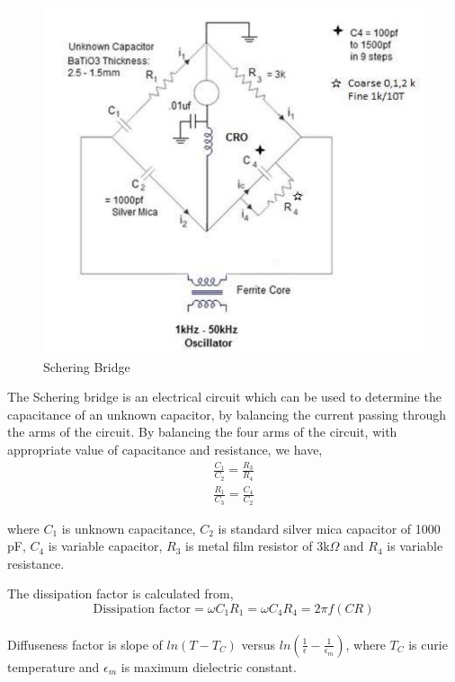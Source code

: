 \documentclass[a4paper, amsfonts, amssymb, amsmath, reprint, showkeys, nofootinbib, twoside]{revtex4-1}
\begin{document}
\begin{figure}[H]
	\centering
	\includegraphics[scale=0.35]{3}
	\caption{Schering Bridge}
	\label{1}
\end{figure}

The Schering bridge is an electrical circuit which can be used to determine the capacitance of an unknown capacitor, by balancing the current passing through the arms of the circuit. By balancing the four arms of the circuit, with appropriate value of capacitance and resistance, we have,
\begin{align}
	\frac {C_1}{ C_2}=\frac{R_3}{R_4}\\
	\frac {R_1}{ C_3}=\frac{C_4}{C_2}
\end{align}

where $C_1$ is unknown capacitance, $C_2$ is standard silver mica capacitor of 1000 pF, $C_4$ is variable capacitor, $R_3$ is metal film resistor of 3k$\Omega$ and $R_4$ is variable resistance. 

The dissipation factor is calculated from,
\begin{equation}
	\text{Dissipation factor}=\omega C_1R_1=\omega C_4R_4=2\pi f (CR)
\end{equation}
\\
Diffuseness factor is slope of $ln(T-T_C)$ versus $ln(\frac{1}{\epsilon}-\frac{1}{\epsilon_m})$, where $T_C$ is curie temperature and $\epsilon_m$ is maximum dielectric constant. 
\end{document}

